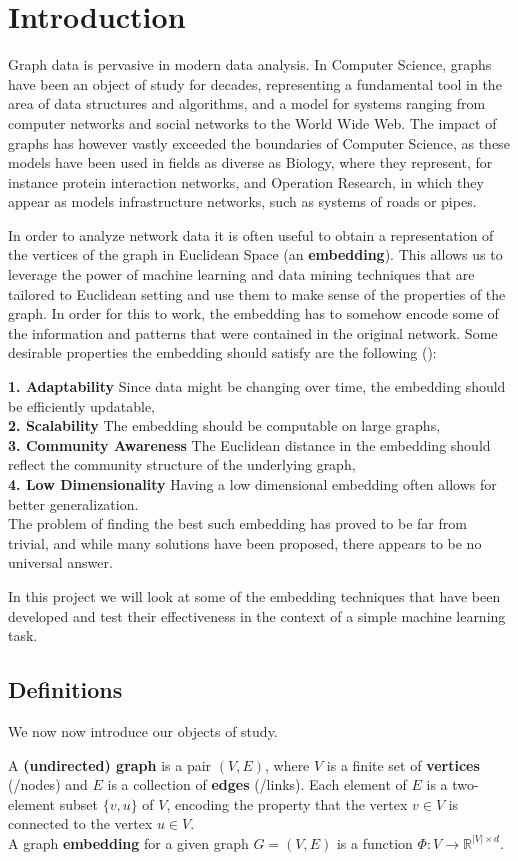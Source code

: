 \section{Introduction}
Graph data is pervasive in modern data analysis. In Computer Science, graphs have been an object of study for decades, representing a fundamental tool in the area of data structures and algorithms, and a model for systems ranging from computer networks and social networks to the World Wide Web. The impact of graphs has however vastly exceeded the boundaries of Computer Science, as these models have been used in fields as diverse as Biology, where they represent, for instance protein interaction networks, and Operation Research, in which they appear as models infrastructure networks, such as systems of roads or pipes.

In order to analyze network data it is often useful to obtain a representation of the vertices of the graph in Euclidean Space (an \textbf{embedding}). This allows us to leverage the power of machine learning and data mining techniques that are tailored to Euclidean setting and use them to make sense of the properties of the graph. In order for this to work, the embedding has to somehow encode some of the information and patterns that were contained in the original network. Some desirable properties the embedding should satisfy are the following (\cite{chen2018tutorial}):

\textbf{1. Adaptability} Since data might be changing over time, the embedding should be efficiently updatable,\\
\textbf{2. Scalability} The embedding should be computable on large graphs,\\
\textbf{3. Community Awareness} The Euclidean distance in the embedding should reflect the community structure of the underlying graph,\\
\textbf{4. Low Dimensionality} Having a low dimensional embedding often allows for better generalization.\\


The problem of finding the best such embedding has proved to be far from trivial, and while many solutions have been proposed, there appears to be no universal answer.

In this project we will look at some of the embedding techniques that have been developed and test their effectiveness in the context of a simple machine learning task.


\subsection{Definitions}
We now now introduce our objects of study.

A \textbf{(undirected) graph} is a pair $(V,E)$, where $V$ is a finite set of \textbf{vertices} (/nodes) and $E$ is a collection of \textbf{edges} (/links). Each element of $E$ is a two-element subset $\{v,u\}$ of $V$, encoding the property that the vertex $v \in V$ is connected to the vertex $u \in V$.\\

A graph \textbf{embedding} for a given graph $G = (V,E)$ is a function $\Phi:V \to \mathbb{R}^{|V| \times d}$.
